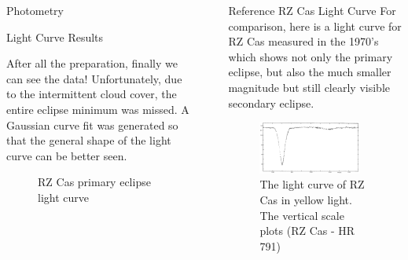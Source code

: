 \documentclass[final]{beamer}
\newlength{\sepwidth}
\newlength{\colwidth}
\newcommand{\separatorcolumn}{\begin{column}{\sepwidth}\end{column}}
\begin{document}
\begin{frame}[t]
\begin{columns}[t]
\begin{column}{\colwidth}
\begin{block}{Photometry}
  \end{block}

  \begin{block}{Light Curve Results}

    After all the preparation, finally we can see the data! Unfortunately,
    due to the intermittent cloud cover, the entire eclipse minimum was missed.
    A Gaussian curve fit was generated so that the general shape of the light 
    curve can be better seen.

    \begin{figure}
      \centering
      \caption{RZ Cas primary eclipse light curve}
    \end{figure}

  \end{block}

\end{column}

\separatorcolumn

\begin{column}{\colwidth}

  \begin{block}{Reference RZ Cas Light Curve}
    For comparison, here is a light curve for RZ Cas measured in the 1970's
    which shows not only the primary eclipse, but also the much smaller magnitude
    but still clearly visible secondary eclipse.

    \begin{figure}
      \centering
      \includegraphics[width=0.9\textwidth]{Reference_RZ_Cas_Light_Curve.png}
        \caption{The light curve of RZ Cas in yellow light. The vertical scale plots \textbf{} (RZ Cas - HR 791) \cite{Chambliss_1976}}
    \end{figure}

  \end{block}


\end{column}
\end{columns}
\end{frame}
\end{document}
